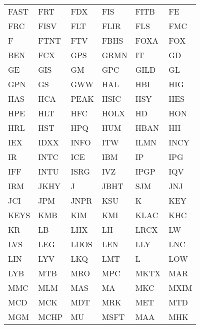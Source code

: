 \documentclass[a4paper]{report}
\begin{document}
\begin{table}[htbp]
\begin{tabular}{ |C{2cm}|C{2cm}|C{2cm}|C{2cm}|C{2cm}|C{2cm}| }
	FAST & FRT & FDX & FIS & FITB & FE\\
	FRC & FISV & FLT & FLIR & FLS & FMC\\
	F & FTNT & FTV & FBHS & FOXA & FOX\\
	BEN & FCX & GPS & GRMN & IT & GD\\
	GE & GIS & GM & GPC & GILD & GL\\
	GPN & GS & GWW & HAL & HBI & HIG\\
	HAS & HCA & PEAK & HSIC & HSY & HES\\
	HPE & HLT & HFC & HOLX & HD & HON\\
	HRL & HST & HPQ & HUM & HBAN & HII\\
	IEX & IDXX & INFO & ITW & ILMN & INCY\\
	IR & INTC & ICE & IBM & IP & IPG\\
	IFF & INTU & ISRG & IVZ & IPGP & IQV\\
	IRM & JKHY & J & JBHT & SJM & JNJ\\
	JCI & JPM & JNPR & KSU & K & KEY\\
	KEYS & KMB & KIM & KMI & KLAC & KHC\\
	KR & LB & LHX & LH & LRCX & LW\\
	LVS & LEG & LDOS & LEN & LLY & LNC\\
	LIN & LYV & LKQ & LMT & L & LOW\\
	LYB & MTB & MRO & MPC & MKTX & MAR\\
	MMC & MLM & MAS & MA & MKC & MXIM\\
	MCD & MCK & MDT & MRK & MET & MTD\\
	MGM & MCHP & MU & MSFT & MAA & MHK\\
	\hline
\end{tabular}
\end{table}
\end{document}
